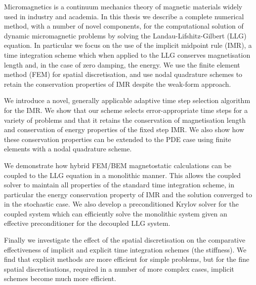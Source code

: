 
Micromagnetics is a continuum mechanics theory of magnetic materials widely used in industry and academia.
In this thesis we describe a complete numerical method, with a number of novel components, for the computational solution of dynamic micromagnetic problems by solving the Landau-Lifshitz-Gilbert  (LLG) equation.
In particular we focus on the use of the implicit midpoint rule (IMR), a time integration scheme which when applied to the LLG conserves magnetisation length and, in the case of zero damping, the energy.
We use the finite element method (FEM) for spatial discretisation, and use nodal quadrature schemes to retain the conservation properties of IMR despite the weak-form approach.

We introduce a novel, generally applicable adaptive time step selection algorithm for the IMR.
We show that our scheme selects error-appropriate time steps for a variety of problems and that it retains the conservation of magnetisation length and conservation of energy properties of the fixed step IMR.
We also show how these conservation properties can be extended to the PDE case using finite elements with a nodal quadrature scheme.

We demonstrate how hybrid FEM/BEM magnetostatic calculations can be coupled to the LLG equation in a monolithic manner.
This allows the coupled solver to maintain all properties of the standard time integration scheme, in particular the energy conservation property of IMR and the solution converged to in the stochastic case.
We also develop a preconditioned Krylov solver for the coupled system which can efficiently solve the monolithic system given an effective preconditioner for the decoupled LLG system.

Finally we investigate the effect of the spatial discretisation on the comparative effectiveness of implicit and explicit time integration schemes (\ie the stiffness).
We find that explicit methods are more efficient for simple problems, but for the fine spatial discretisations, required in a number of more complex cases, implicit schemes become much more efficient.


